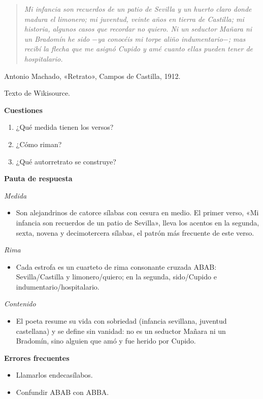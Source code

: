 \documentclass{book}
\begin{document}
\begin{quote}
\itshape Mi infancia son recuerdos de un patio de Sevilla y un huerto claro donde madura el limonero; mi juventud, veinte años en tierra de Castilla; mi historia, algunos casos que recordar no quiero. Ni un seductor Mañara ni un Bradomín he sido \(-\)ya conocéis mi torpe aliño indumentario\(-\); mas recibí la flecha que me asignó Cupido y amé cuanto ellas pueden tener de hospitalario.
\end{quote}
{\noindent\footnotesize Antonio Machado, «Retrato», Campos de Castilla, 1912.\par}
{\noindent\footnotesize Texto de Wikisource.\par}

\noindent\textbf{Cuestiones}
\begin{enumerate}
\item ¿Qué medida tienen los versos?
\item ¿Cómo riman?
\item ¿Qué autorretrato se construye?
\end{enumerate}

\noindent\textbf{Pauta de respuesta}

\noindent\textit{Medida}
\begin{itemize}
\item Son alejandrinos de catorce sílabas con cesura en medio. El primer verso, «Mi infancia son recuerdos de un patio de Sevilla», lleva los acentos en la segunda, sexta, novena y decimotercera sílabas, el patrón más frecuente de este verso.
\end{itemize}

\noindent\textit{Rima}
\begin{itemize}
\item Cada estrofa es un cuarteto de rima consonante cruzada ABAB: Sevilla/Castilla y limonero/quiero; en la segunda, sido/Cupido e indumentario/hospitalario.
\end{itemize}

\noindent\textit{Contenido}
\begin{itemize}
\item El poeta resume su vida con sobriedad (infancia sevillana, juventud castellana) y se define sin vanidad: no es un seductor Mañara ni un Bradomín, sino alguien que amó y fue herido por Cupido.
\end{itemize}

\noindent\textbf{Errores frecuentes}
\begin{itemize}
\item Llamarlos endecasílabos.
\item Confundir ABAB con ABBA.
\end{itemize}
\end{document}
